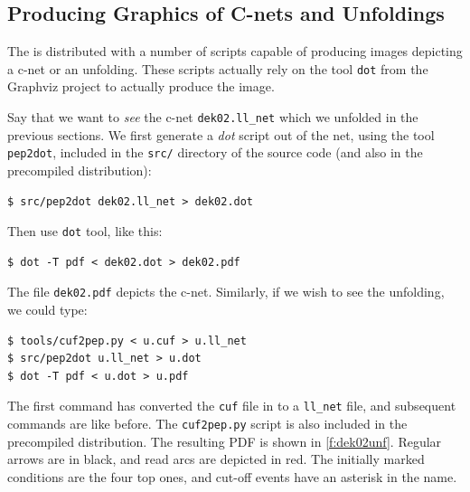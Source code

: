 \documentclass[a4paper]{refart}
\begin{document}

\subsection{Producing Graphics of C-nets and Unfoldings}%
\label{s:seeing}

The \cunft{} is distributed with a number of scripts capable
of producing images depicting a c-net or an unfolding.
These scripts actually rely on the tool \verb!dot! from the Graphviz
project\cite{Graphviz} to actually produce the image.

Say that we want to \textit{see} the c-net \verb!dek02.ll_net! which we
unfolded in the previous sections.
We first generate a \textit{dot} script out of the net, using the tool
\verb!pep2dot!, included in the \verb!src/! directory of the source code
(and also in the precompiled distribution):
\begin{verbatim}
$ src/pep2dot dek02.ll_net > dek02.dot
\end{verbatim}
Then use \verb!dot! tool, like this:
\begin{verbatim}
$ dot -T pdf < dek02.dot > dek02.pdf
\end{verbatim}
The file \verb!dek02.pdf! depicts the c-net.
Similarly, if we wish to see the unfolding, we could type:
\begin{verbatim}
$ tools/cuf2pep.py < u.cuf > u.ll_net
$ src/pep2dot u.ll_net > u.dot
$ dot -T pdf < u.dot > u.pdf
\end{verbatim}
The first command has converted the \verb!cuf! file in to a
\verb!ll_net! file, and subsequent commands are like before.
The \verb!cuf2pep.py! script is also included in the precompiled
distribution.
The resulting PDF is shown in \cref{f:dek02unf}.
Regular arrows are in black, and read arcs are depicted in red.
The initially marked conditions are the four top ones,
and cut-off events have an asterisk in the name.
\end{document}
